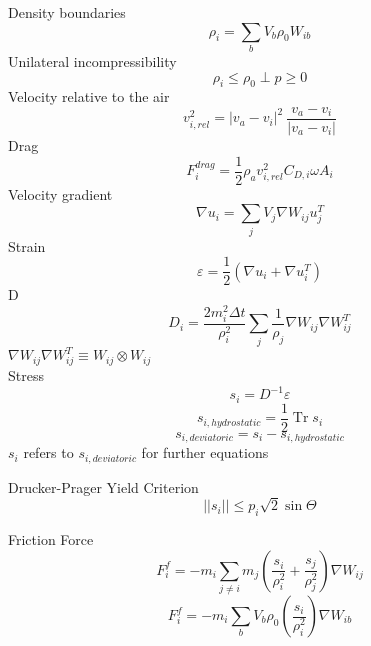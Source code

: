 \documentclass[intern]{cgMA}
\DeclareMathOperator{\Tr}{Tr}
\begin{document}
    Density boundaries
    \begin{equation}
        \rho_i = \sum_b V_b \rho_0 W_{ib}
    \end{equation}
    Unilateral incompressibility 
    \begin{equation}
        \rho_i \leq \rho_0 \; \bot \;  p \geq 0
    \end{equation}
    Velocity relative to the air
    \begin{equation}
        v^2_{i,rel} = |v_a - v_i|^2\ \frac{v_a - v_i}{|v_a - v_i|}
    \end{equation}
    Drag
    \begin{equation}
        F^{drag}_i = \frac{1}{2}\rho_a v^2_{i,rel} C_{D,i}  \omega  A_i
    \end{equation}
    Velocity gradient
    \begin{equation}
        \nabla u_i = \sum_j V_j \nabla W_{ij} u_j^T
    \end{equation}
    Strain
    \begin{equation}
        \varepsilon = \frac{1}{2} (\nabla u_i + \nabla u_i^T)
    \end{equation}
    D
    \begin{equation}
        D_i = \frac{2 m_i^2 \Delta t}{\rho_i^2} \sum_j \frac{1}{\rho_j} \nabla W_{ij}  \nabla W_{ij}^T
    \end{equation}
    $\nabla W_{ij}  \nabla W_{ij}^T \equiv W_{ij} \otimes W_{ij}$\\
    Stress
    \begin{equation}
        s_i = D^{-1} \varepsilon
    \end{equation}
    \begin{equation}
        s_{i, hydrostatic} = \frac{1}{2} \Tr s_i 
    \end{equation}
    \begin{equation}
        s_{i, deviatoric} = s_i - s_{i, hydrostatic} 
    \end{equation}
    $s_i$ refers to $s_{i, deviatoric}$ for further equations

    Drucker-Prager Yield Criterion
    \begin{equation}
        ||s_i|| \leq p_i \sqrt{2} \sin \Theta
    \end{equation}

    Friction Force
    \begin{equation}
        F_i^f = -m_i \sum_{j \neq i} m_j (\frac{s_i}{\rho_i^2} + \frac{s_j}{\rho_j^2})  \nabla W_{ij}
    \end{equation}
    \begin{equation}
        F_i^f = -m_i \sum_{b} V_b \rho_0 (\frac{s_i}{\rho_i^2}) \nabla W_{ib}
    \end{equation}
\end{document}
